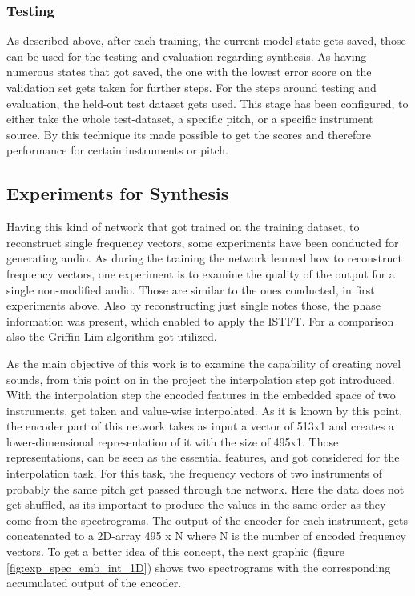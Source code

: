 \subsubsection{Testing}
As described above, after each training, the current model state gets saved, those can be used for the testing and evaluation regarding synthesis. As having numerous states that got saved, the one with the lowest error score on the validation set gets taken for further steps. For the steps around testing and evaluation, the held-out test dataset gets used. This stage has been configured, to either take the whole test-dataset, a specific pitch, or a specific instrument source. By this technique its made possible to get the scores and therefore performance for certain instruments or pitch. 

\subsection{Experiments for Synthesis}
Having this kind of network that got trained on the training dataset, to reconstruct single frequency vectors, some experiments have been conducted for generating audio. As during the training the network learned how to reconstruct frequency vectors, one experiment is to examine the quality of the output for a single non-modified audio. Those are similar to the ones conducted, in first experiments above. Also by reconstructing just single notes those, the phase information was present, which enabled to apply the ISTFT. For a comparison also the Griffin-Lim algorithm got utilized.

As the main objective of this work is to examine the capability of creating novel sounds, from this point on in the project the interpolation step got introduced. With the interpolation step the encoded features in the embedded space of two instruments, get taken and value-wise interpolated. As it is known by this point, the encoder part of this network takes as input a vector of 513x1 and creates a lower-dimensional representation of it with the size of 495x1. Those representations, can be seen as the essential features, and got considered for the interpolation task. For this task, the frequency vectors of two instruments of probably the same pitch get passed through the network. Here the data does not get shuffled, as its important to produce the values in the same order as they come from the spectrograms. The output of the encoder for each instrument, gets concatenated to a 2D-array 495 x N where N is the number of encoded frequency vectors. To get a better idea of this concept, the next graphic (figure \ref{fig:exp_spec_emb_int_1D}) shows two spectrograms with the corresponding accumulated output of the encoder. 

